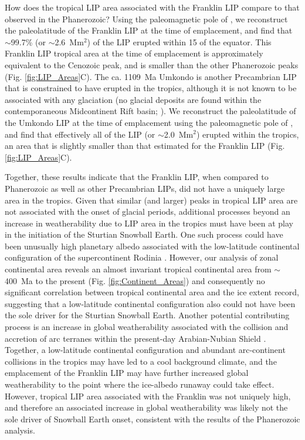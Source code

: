 \documentclass[11pt,letterpaper]{article}
\begin{document}
How does the tropical LIP area associated with the Franklin LIP compare to that observed in the Phanerozoic? Using the paleomagnetic pole of \citet{Denyszyn2009a}, we reconstruct the paleolatitude of the Franklin LIP at the time of emplacement, and find that $\sim$99.7\% (or $\sim$2.6~Mm$^{2}$) of the LIP erupted within 15\textdegree\xspace of the equator. This Franklin LIP tropical area at the time of emplacement is approximately equivalent to the Cenozoic peak, and is smaller than the other Phanerozoic peaks (Fig. \ref{fig:LIP_Areas}C). The ca. 1109~Ma Umkondo is another Precambrian LIP that is constrained to have erupted in the tropics, although it is not known to be associated with any glaciation (no glacial deposits are found within the contemporaneous Midcontinent Rift basin; \citealp{Swanson-Hysell2019a}). We reconstruct the paleolatitude of the Umkondo LIP at the time of emplacement using the paleomagnetic pole of \citet{Swanson-Hysell2015b}, and find that effectively all of the LIP (or $\sim$2.0~Mm$^{2}$) erupted within the tropics, an area that is slightly smaller than that estimated for the Franklin LIP (Fig. \ref{fig:LIP_Areas}C).

Together, these results indicate that the Franklin LIP, when compared to Phanerozoic as well as other Precambrian LIPs, did not have a uniquely large area in the tropics. Given that similar (and larger) peaks in tropical LIP area are not associated with the onset of glacial periods, additional processes beyond an increase in weatherability due to LIP area in the tropics must have been at play in the initiation of the Sturtian Snowball Earth. One such process could have been unusually high planetary albedo associated with the low-latitude continental configuration of the supercontinent Rodinia \citep{Kirschvink1992a, Li2008a}. However, our analysis of zonal continental area reveals an almost invariant tropical continental area from $\sim$400~Ma to the present (Fig. \ref{fig:Continent_Areas}) and consequently no significant correlation between tropical continental area and the ice extent record, suggesting that a low-latitude continental configuration also could not have been the sole driver for the Sturtian Snowball Earth. Another potential contributing process is an increase in global weatherability associated with the collision and accretion of arc terranes within the present-day Arabian-Nubian Shield \citep{Park2018a}. Together, a low-latitude continental configuration and abundant arc-continent collisions in the tropics may have led to a cool background climate, and the emplacement of the Franklin LIP may have further increased global weatherability to the point where the ice-albedo runaway could take effect. However, tropical LIP area associated with the Franklin was not uniquely high, and therefore an associated increase in global weatherability was likely not the sole driver of Snowball Earth onset, consistent with the results of the Phanerozoic analysis.
\end{document}
